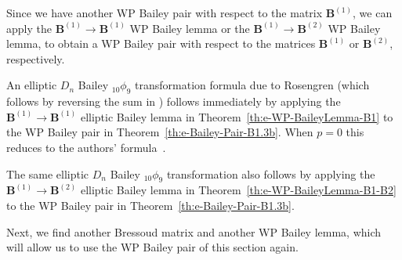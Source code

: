 \documentclass[pdftex]{sigma}
\numberwithin{equation}{section}
\newcommand{\B}{{ \mathbf B}}
\begin{document}
Since we have another WP Bailey pair with respect to the matrix $\B^{(1)}$, we can apply the $\B^{(1)} \to\B^{(1)}$ WP Bailey lemma or the $\B^{(1)} \to\B^{(2)}$ WP Bailey lemma, to obtain a WP Bailey pair with respect to the matrices $\B^{(1)}$ or $\B^{(2)}$, respectively.

An elliptic $D_n$ Bailey $_{10}\phi_9$ transformation formula due to Rosengren (which follows by reversing the sum in \cite[Corollary~8.5]{HR2004}) follows immediately by applying the $\B^{(1)}\to\B^{(1)}$ elliptic Bailey lemma in Theorem~\ref{th:e-WP-BaileyLemma-B1} to the WP Bailey pair in Theorem~\ref{th:e-Bailey-Pair-B1.3b}. When $p=0$ this reduces to the authors' formula~\cite[Theorem~3.9]{BS1998}.

The same elliptic $D_n$ Bailey $_{10}\phi_9$ transformation also follows by applying the $\B^{(1)}\to\B^{(2)}$ elliptic Bailey lemma in Theorem~\ref{th:e-WP-BaileyLemma-B1-B2} to the WP Bailey pair in Theorem~\ref{th:e-Bailey-Pair-B1.3b}.

Next, we find another Bressoud matrix and another WP Bailey lemma, which will allow us to use the WP Bailey pair of this section again.
\end{document}
